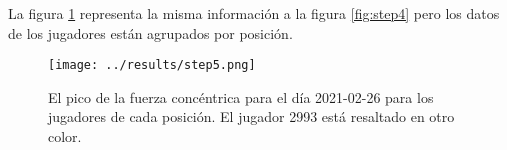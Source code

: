 La figura \ref{fig:step5} representa la misma información a la figura \ref{fig:step4} pero los datos
de los jugadores están agrupados por posición.

\begin{figure}[H]
\centering
\texttt{[image: ../results/step5.png]}
\caption{El pico de la fuerza concéntrica para el día 2021-02-26 para los jugadores de cada posición. El jugador 2993 está resaltado en otro color.}
\label{fig:step5}
\end{figure}


